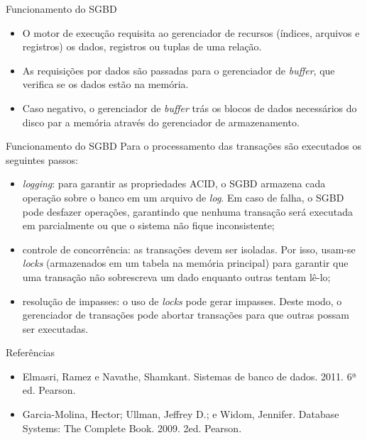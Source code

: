 \documentclass[11pt]{beamer}
\begin{document}
\begin{frame}{Funcionamento do SGBD}
    \begin{itemize}
        \item O motor de execução requisita ao gerenciador de recursos (índices, arquivos e registros) os dados, registros ou tuplas de uma relação.
        \item As requisições por dados são passadas para o gerenciador de \textit{buffer}, que verifica se os dados estão na memória.
        \item Caso negativo, o gerenciador de \textit{buffer} trás os blocos de dados necessários do disco par a memória através do gerenciador de armazenamento.
    \end{itemize}
\end{frame}

\begin{frame}{Funcionamento do SGBD}
    Para o processamento das transações são executados os seguintes passos:
    \begin{itemize}
        \item \textit{logging}: para garantir as propriedades ACID, o SGBD armazena cada operação sobre o banco em um arquivo de \textit{log}. Em caso de falha, o SGBD pode desfazer operações, garantindo que nenhuma transação será executada em parcialmente ou que o sistema não fique inconsistente;
        \item controle de concorrência: as transações devem ser isoladas. Por isso, usam-se \textit{locks} (armazenados em um tabela na memória principal) para garantir que uma transação não sobrescreva um dado enquanto outras tentam lê-lo;
        \item resolução de impasses: o uso de \textit{locks} pode gerar impasses. Deste modo, o gerenciador de transações pode abortar transações para que outras possam ser executadas.
    \end{itemize}
\end{frame}

\begin{frame}{Referências}
    \begin{itemize}
        \item Elmasri, Ramez e Navathe, Shamkant. Sistemas de banco de dados. 2011. 6ª ed. Pearson.
        \item Garcia-Molina, Hector; Ullman, Jeffrey D.; e Widom, Jennifer. Database Systems: The Complete Book. 2009. 2ed. Pearson.
    \end{itemize}
\end{frame}
\end{document}
